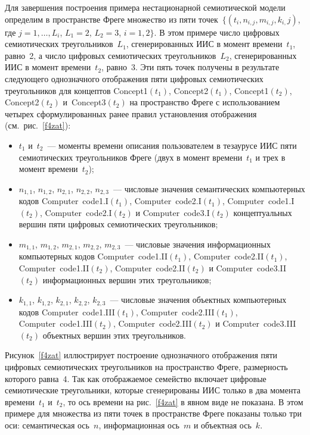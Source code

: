 \begin{multicols}{2}
   Для завершения построения примера нестационарной семиотической модели определим в 
пространстве Фреге множество из пяти точек~$\{(t_i, n_{i,j}, m_{i,j}, k_{i,}j)$, где $j = 1, \ldots , 
L_i$, $L_1 = 2$, $L_2 = 3$, $i = 1, 2\}$. В этом примере число циф\-ро\-вых семиотических 
треугольников~$L_1$, сгенерированных ИИС в момент времени~$t_1$, равно~2, а число 
циф\-ро\-вых семиотических треугольников~$L_2$, сгенерированных ИИС в момент 
времени~$t_2$, равно~3. Эти пять точек получены в результате следующего однозначного 
отображения пяти циф\-ро\-вых семиотических треугольников для концептов Concept1$(t_1)$, 
Concept2$(t_1)$, Concept1$(t_2)$, Concept2$(t_2)$ и~Concept3$(t_2)$ на пространство Фреге с 
использованием четырех сформулированных ранее правил установления отображения (см.\ 
рис.~\ref{f4zat}):
\begin{itemize}
\item
$t_1$ и~$t_2$~--- моменты времени описания пользователем в тезаурусе ИИС пяти 
семиотических треугольников Фреге (двух в момент времени~$t_1$ и трех в 
момент времени~$t_2$);
\item $n_{1,1}$, $n_{1,2}$, $n_{2,1}$, $n_{2,2}$, $n_{2,3}$~--- числовые значения 
семантических компьютерных кодов Computer\ code1.I$(t_1)$, Computer\ 
code2.I$(t_1)$, Computer\ code1.I$(t_2)$, Computer\ code2.I$(t_2)$ и Computer\ 
code3.I$(t_2)$ концептуальных вершин пяти циф\-ро\-вых семиотических 
треугольников;
\item $m_{1,1}$, $m_{1,2}$, $m_{2,1}$, $m_{2,2}$, $m_{2,3}$~--- числовые значения 
информационных компьютерных кодов Computer\ code1.II$(t_1)$, Computer\ 
code2.II$(t_1)$, Computer\ code1.II$(t_2)$, Computer\ code2.II$(t_2)$ и Computer\ 
code3.II$(t_2)$ информационных вершин этих треугольников;
\item $k_{1,1}$, $k_{1,2}$, $k_{2,1}$, $k_{2,2}$, $k_{2,3}$~--- чис\-ло\-вые значения объектных 
компьютерных кодов Computer\ code1.III$(t_1)$, Computer\ code2.III$(t_1)$, 
Computer\ code1.III$(t_2)$, Computer\ code2.III$(t_2)$ и Computer\ code3.III$(t_2)$ 
объектных вершин этих треугольников.
\end{itemize}

   Рисунок~\ref{f4zat} иллюстрирует построение однозначного отображения пяти цифровых 
семиотических треугольников на пространство Фреге, размерность которого равна~4. Так 
как отображаемое семейство включает цифровые семиотические треугольники, которые 
сгенерированы ИИС только в два момента времени~$t_1$ и~$t_2$, то ось времени на 
рис.~\ref{f4zat} в явном виде не показана. В этом примере для множества из пяти точек в 
пространстве Фреге показаны только три оси: семантическая ось~$n$, информационная 
ось~$m$ и объектная ось~$k$.
   

\end{multicols}
